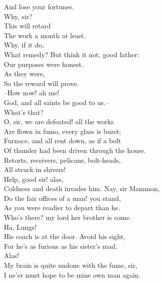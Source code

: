 \documentclass{memoir}
\begin{document}
\begin{drama*}
 And lose your fortunes.\\
\mammonspeaks {} Why, sir?\\
\subtlespeaks {} This will retard\\
 The work a month at least.\\
\mammonspeaks {} Why, if it do,\\
 What remedy? But think it not, good father:\\
 Our purposes were honest.\\
\subtlespeaks {} As they were,\\
 So the reward will prove.\\
 --How now! ah me!\\
 God, and all saints be good to us.--\\
 What's that?\\
\facespeaks {} O, sir, we are defeated! all the works\\
 Are flown in fumo, every glass is burst;\\
 Furnace, and all rent down, as if a bolt\\
 Of thunder had been driven through the house.\\
 Retorts, receivers, pelicans, bolt-heads,\\
 All struck in shivers!\\
 Help, good sir! alas,\\
 Coldness and death invades him. Nay, sir Mammon,\\
 Do the fair offices of a man! you stand,\\
 As you were readier to depart than he.\\
 Who's there? my lord her brother is come.\\
\mammonspeaks {} Ha, Lungs!\\
\facespeaks  His coach is at the door. Avoid his sight,\\
 For he's as furious as his sister's mad.\\
\mammonspeaks  Alas!\\
\facespeaks {} My brain is quite undone with the fume, sir,\\
 I ne'er must hope to be mine own man again.\\

\end{drama*}
\end{document}
